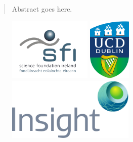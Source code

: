 \documentclass[british,a4paper,12pt]{phdthesis}
\begin{document}

\onehalfspacing


\begin{abstract}\label{abstract}
\vspace{-5.0em}

Abstract goes here. 

\end{abstract}



\cite{Sample2000}

%


\singlespacing



\newpage

\phantom{a}
 
\begin{figure}[b]
  \centering
	\includegraphics[height=3cm]{graphics/logos/SFI.png} %
	\hfill
	\includegraphics[height=3cm]{graphics/logos/ucd_brandmark_colour.jpg}%
	\hfill
	\includegraphics[height=3cm]{graphics/logos/insightlogo.pdf}%
\end{figure}
\end{document}
